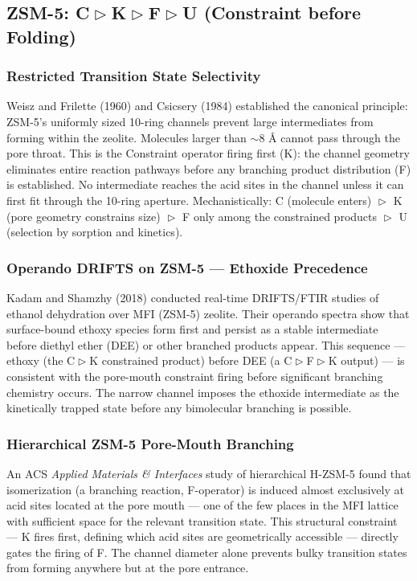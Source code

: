 \documentclass[11pt]{article}
\newcommand{\comp}{\mathrel{\triangleright}} %
\begin{document}
\subsection{ZSM-5: C$\comp$K$\comp$F$\comp$U (Constraint before Folding)}

\subsubsection{Restricted Transition State Selectivity}

Weisz and Frilette (1960) and Csicsery (1984) established the canonical principle: ZSM-5's uniformly sized 10-ring channels prevent large intermediates from forming within the zeolite. Molecules larger than $\sim 8$ \AA{} cannot pass through the pore throat. This is the Constraint operator firing first (K): the channel geometry eliminates entire reaction pathways before any branching product distribution (F) is established. No intermediate reaches the acid sites in the channel unless it can first fit through the 10-ring aperture. Mechanistically: C (molecule enters) $\comp$ K (pore geometry constrains size) $\comp$ F only among the constrained products $\comp$ U (selection by sorption and kinetics).

\subsubsection{Operando DRIFTS on ZSM-5 --- Ethoxide Precedence}

Kadam and Shamzhy (2018) conducted real-time DRIFTS/FTIR studies of ethanol dehydration over MFI (ZSM-5) zeolite. Their operando spectra show that surface-bound ethoxy species form first and persist as a stable intermediate before diethyl ether (DEE) or other branched products appear. This sequence --- ethoxy (the C$\comp$K constrained product) before DEE (a C$\comp$F$\comp$K output) --- is consistent with the pore-mouth constraint firing before significant branching chemistry occurs. The narrow channel imposes the ethoxide intermediate as the kinetically trapped state before any bimolecular branching is possible.

\subsubsection{Hierarchical ZSM-5 Pore-Mouth Branching}

An ACS \emph{Applied Materials \& Interfaces} study of hierarchical H-ZSM-5 found that isomerization (a branching reaction, F-operator) is induced almost exclusively at acid sites located at the pore mouth --- one of the few places in the MFI lattice with sufficient space for the relevant transition state. This structural constraint --- K fires first, defining which acid sites are geometrically accessible --- directly gates the firing of F. The channel diameter alone prevents bulky transition states from forming anywhere but at the pore entrance.
\end{document}

